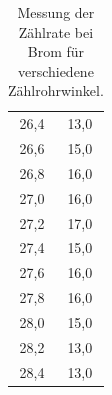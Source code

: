 \begin{table}[H]
\begin{minipage}[c]{0.4\textwidth}
\begin{tabular}{c|c}
    26,4	& 13,0 \\
    26,6	& 15,0 \\
    26,8	& 16,0 \\
    27,0	& 16,0 \\
    27,2	& 17,0 \\
    27,4	& 15,0 \\
    27,6	& 16,0 \\
    27,8	& 16,0 \\
    28,0	& 15,0 \\
    28,2	& 13,0 \\
    28,4	& 13,0
  \end{tabular}
  \captionsetup{width=7cm}
  \caption{Messung der Zählrate bei Brom für verschiedene Zählrohrwinkel.}
\end{minipage}
\end{table}


